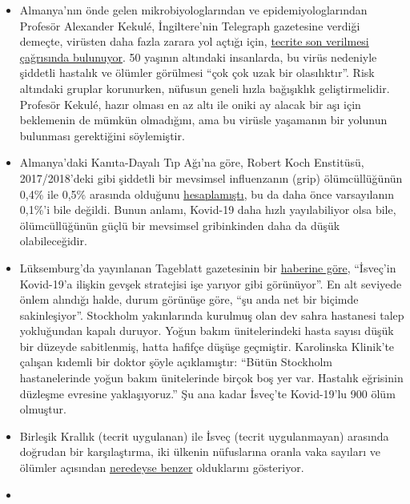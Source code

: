 \begin{itemize}
\tightlist
\item
  Almanya'nın önde gelen mikrobiyologlarından ve epidemiyologlarından
  Profesör Alexander Kekulé, İngiltere'nin Telegraph gazetesine verdiği
  demeçte, virüsten daha fazla zarara yol açtığı için,
  \href{https://www.telegraph.co.uk/news/2020/04/11/german-scientist-predicted-european-epidemic-calls-end-lockdown/}{tecrite
  son verilmesi çağrısında bulunuyor}. 50 yaşının altındaki insanlarda,
  bu virüs nedeniyle şiddetli hastalık ve ölümler görülmesi ``çok çok
  uzak bir olasılıktır''. Risk altındaki gruplar korunurken, nüfusun
  geneli hızla bağışıklık geliştirmelidir. Profesör Kekulé, hazır olması
  en az altı ile oniki ay alacak bir aşı için beklemenin de mümkün
  olmadığını, ama bu virüsle yaşamanın bir yolunun bulunması gerektiğini
  söylemiştir.
\item
  Almanya'daki Kanıta-Dayalı Tıp Ağı'na göre, Robert Koch Enstitüsü,
  2017/2018'deki gibi şiddetli bir mevsimsel influenzanın (grip)
  ölümcüllüğünün 0,4\% ile 0,5\% arasında olduğunu
  \href{https://www.ebm-netzwerk.de/en/publications/covid-19}{hesaplamıştı},
  bu da daha önce varsayılanın 0,1\%'i bile değildi. Bunun anlamı,
  Kovid-19 daha hızlı yayılabiliyor olsa bile, ölümcüllüğünün güçlü bir
  mevsimsel gribinkinden daha da düşük olabileceğidir.
\item
  Lüksemburg'da yayınlanan Tageblatt gazetesinin bir
  \href{https://swprs.files.wordpress.com/2020/04/volksblatt_schweden_corona_20200414_18.pdf}{haberine
  göre}, ``İsveç'in Kovid-19'a ilişkin gevşek stratejisi işe yarıyor
  gibi görünüyor''. En alt seviyede önlem alındığı halde, durum görünüşe
  göre, ``şu anda net bir biçimde sakinleşiyor''. Stockholm yakınlarında
  kurulmuş olan dev sahra hastanesi talep yokluğundan kapalı duruyor.
  Yoğun bakım ünitelerindeki hasta sayısı düşük bir düzeyde sabitlenmiş,
  hatta hafifçe düşüşe geçmiştir. Karolinska Klinik'te çalışan kıdemli
  bir doktor şöyle açıklamıştır: ``Bütün Stockholm hastanelerinde yoğun
  bakım ünitelerinde birçok boş yer var. Hastalık eğrisinin düzleşme
  evresine yaklaşıyoruz.'' Şu ana kadar İsveç'te Kovid-19'lu 900 ölüm
  olmuştur.
\item
  Birleşik Krallık (tecrit uygulanan) ile İsveç (tecrit uygulanmayan)
  arasında doğrudan bir karşılaştırma, iki ülkenin nüfuslarına oranla
  vaka sayıları ve ölümler açısından
  \href{http://www.theblogmire.com/a-comparison-of-lockdown-uk-with-non-lockdown-sweden/}{neredeyse
  benzer} olduklarını gösteriyor.
\item

\end{itemize}
